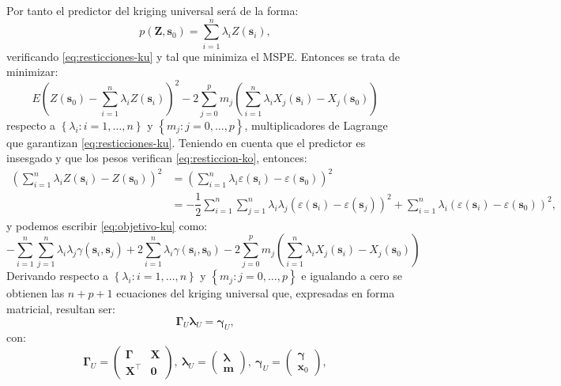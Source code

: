 \documentclass[
  spanish,
]{book}
\theoremstyle{break}
\theoremstyle{definition}
\theoremstyle{definition}
\theoremstyle{definition}
\theoremstyle{definition}
\theoremstyle{remark}
\begin{document}
Por tanto el predictor del kriging universal será de la forma:
\[p(\mathbf{Z},\mathbf{s}_{0})=\sum\limits_{i=1}^{n}\lambda_{i} Z(\mathbf{s}_{i}),\]
verificando \eqref{eq:resticciones-ku} y tal que minimiza el MSPE.
Entonces se trata de minimizar:
\begin{equation}
  E\left( Z(\mathbf{s}_{0})-\sum\limits_{i=1}^{n}\lambda_{i} Z(\mathbf{s}_{i}) \right)^{2} - 2\sum\limits_{j=0}^{p}m_{j} \left( \sum\limits_{i=1}^{n} \lambda_{i} X_{j} (\mathbf{s}_{i})- X_{j}(\mathbf{s}_{0}) \right)
  \label{eq:objetivo-ku}
\end{equation}
respecto a \(\left\{ \lambda_{i} :i=1, \ldots,n\right\}\) y \(\left\{ m_{j} :j=0, \ldots,p\right\}\), multiplicadores de Lagrange que garantizan \eqref{eq:resticciones-ku}.
Teniendo en cuenta que el predictor es insesgado y que los pesos verifican \eqref{eq:resticcion-ko}, entonces:
\[\begin{aligned}
\left( \sum\limits_{i=1}^{n}\lambda_{i} Z(\mathbf{s}_{i}) - Z(\mathbf{s}_{0})\right)^2  
& = \left( \sum\limits_{i=1}^{n}\lambda_{i} \varepsilon(\mathbf{s}_{i}) - \varepsilon(\mathbf{s}_{0})\right)^2  \\
& = -\dfrac{1}{2} \sum\limits_{i=1}^{n}\sum\limits_{j=1}^{n}\lambda_{i}\lambda_{j} \left( \varepsilon(\mathbf{s}_{i}) - \varepsilon(\mathbf{s}_{j} )\right)^{2}  + \sum\limits_{i=1}^{n}\lambda_{i} \left( \varepsilon(\mathbf{s}_{i}) - \varepsilon(\mathbf{s}_{0}) \right)^{2},
\end{aligned}\]
y podemos escribir \eqref{eq:objetivo-ku} como:
\[-\sum\limits_{i=1}^{n}\sum\limits_{j=1}^{n}\lambda_{i} \lambda_{j}
\gamma(\mathbf{s}_{i},\mathbf{s}_{j} ) +2 \sum\limits_{i=1}^{n}\lambda
_{i} \gamma(\mathbf{s}_{i},\mathbf{s}_{0}) -2\sum\limits_{j=0}^{p}m_{j}
\left( \sum\limits_{i=1}^{n}\lambda_{i} X_{j} (\mathbf{s}_{i})-X_{j}
(\mathbf{s}_{0}) \right)\] Derivando respecto a
\(\left\{ \lambda_{i} :i=1, \ldots,n\right\}\) y
\(\left\{ m_{j} :j=0, \ldots,p\right\}\) e igualando a cero se obtienen las
\(n+p+1\) ecuaciones del kriging universal que, expresadas en forma
matricial, resultan ser:
\[\boldsymbol{\Gamma}_{U} \boldsymbol{\lambda}_{U} =\boldsymbol{\gamma}_{U},\]
con:
\[\boldsymbol{\Gamma}_{U} = \left( \begin{array}{lc}
\boldsymbol{\Gamma} & \mathbf{X} \\
\mathbf{X^\top } & \mathbf{0}
\end{array} \right) ,\ 
\boldsymbol{\lambda}_{U} = \left( \begin{array}{c}
\boldsymbol{\lambda} \\
\mathbf{m}
\end{array} \right) ,\ 
\boldsymbol{\gamma}_{U} =\left( \begin{array}{c}
\boldsymbol{\gamma} \\
\mathbf{x}_0
\end{array} \right),\]
\end{document}
